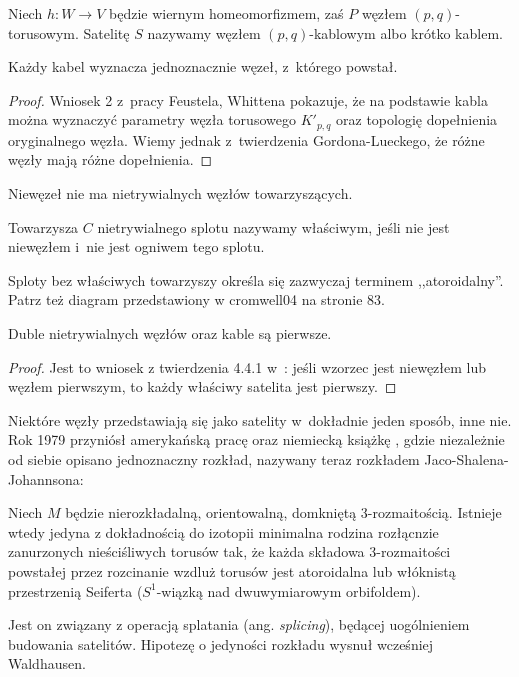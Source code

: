 \begin{definition}
	Niech $h \colon W \to V$ będzie wiernym homeomorfizmem, zaś $P$ węzłem $(p, q)$-torusowym.
	Satelitę $S$ nazywamy węzłem $(p, q)$-kablowym albo krótko kablem.
\end{definition}

\begin{proposition}
    Każdy kabel wyznacza jednoznacznie węzeł, z~którego powstał.
\end{proposition}

\begin{proof}
    Wniosek 2 z~pracy \cite{feustel78} Feustela, Whittena pokazuje, że na podstawie kabla można wyznaczyć parametry węzła torusowego $K'_{p,q}$ oraz topologię dopełnienia oryginalnego węzła.
    Wiemy jednak z~twierdzenia Gordona-Lueckego, że różne węzły mają różne dopełnienia.
\end{proof}

Niewęzeł nie ma nietrywialnych węzłów towarzyszących.

\begin{definition}
	Towarzysza $C$ nietrywialnego splotu nazywamy właściwym, jeśli nie jest niewęzłem i~nie jest ogniwem tego splotu.
\end{definition}

Sploty bez właściwych towarzyszy określa się zazwyczaj terminem ,,atoroidalny''.
Patrz też diagram przedstawiony w {cromwell04} na stronie 83.

\begin{proposition}
	Duble nietrywialnych węzłów oraz kable są pierwsze.
\end{proposition}

\begin{proof}
	Jest to wniosek z twierdzenia 4.4.1 w~\cite{cromwell04}: jeśli wzorzec jest niewęzłem lub węzłem pierwszym, to każdy właściwy satelita jest pierwszy.
\end{proof}

Niektóre węzły przedstawiają się jako satelity w~dokładnie jeden sposób, inne nie.
Rok 1979 przyniósł amerykańską pracę \cite{jaco79} oraz niemiecką książkę \cite{johannson79}, gdzie niezależnie od siebie opisano jednoznaczny rozkład, nazywany teraz rozkładem Jaco-Shalena-Johannsona:

\begin{proposition}
	Niech $M$ będzie nierozkładalną, orientowalną, domkniętą 3-rozmaitością.
	Istnieje wtedy jedyna z dokładnością do izotopii minimalna rodzina rozłącnzie zanurzonych nieściśliwych torusów tak, że każda składowa 3-rozmaitości powstałej przez rozcinanie wzdluż torusów jest atoroidalna lub włóknistą przestrzenią Seiferta ($S^1$-wiązką nad dwuwymiarowym orbifoldem).
\end{proposition}

Jest on związany z operacją splatania (ang. \emph{splicing}), będącej uogólnieniem budowania satelitów.
Hipotezę o jedyności rozkładu wysnuł wcześniej Waldhausen.

